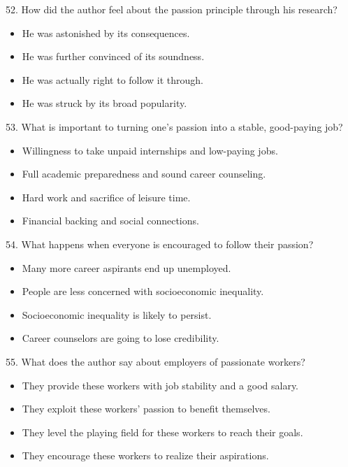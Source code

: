 \documentclass[UTF8,11pt]{ctexart}
\begin{document}
52. How did the author feel about the passion principle through his research?


\begin{itemize}[leftmargin=2em,itemsep=.2em,topsep=.4em]\item[A.] He was astonished by its consequences.
\item[B.] He was further convinced of its soundness.
\item[C.] He was actually right to follow it through.
\item[D.] He was struck by its broad popularity.
\end{itemize}

53. What is important to turning one’s passion into a stable, good-paying job?


\begin{itemize}[leftmargin=2em,itemsep=.2em,topsep=.4em]\item[A.] Willingness to take unpaid internships and low-paying jobs.
\item[B.] Full academic preparedness and sound career counseling.
\item[C.] Hard work and sacrifice of leisure time.
\item[D.] Financial backing and social connections.
\end{itemize}

54. What happens when everyone is encouraged to follow their passion?


\begin{itemize}[leftmargin=2em,itemsep=.2em,topsep=.4em]\item[A.] Many more career aspirants end up unemployed.
\item[B.] People are less concerned with socioeconomic inequality.
\item[C.] Socioeconomic inequality is likely to persist.
\item[D.] Career counselors are going to lose credibility.
\end{itemize}

55. What does the author say about employers of passionate workers?


\begin{itemize}[leftmargin=2em,itemsep=.2em,topsep=.4em]\item[A.] They provide these workers with job stability and a good salary.
\item[B.] They exploit these workers’ passion to benefit themselves.
\item[C.] They level the playing field for these workers to reach their goals.
\item[D.] They encourage these workers to realize their aspirations.
\end{itemize}
\end{document}
